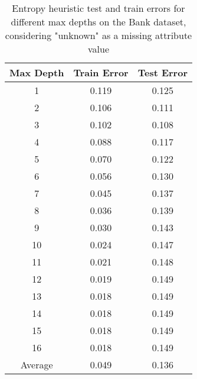 \documentclass[12pt, fullpage,letterpaper]{article}
\begin{document}
\begin{enumerate}
\begin{enumerate}
\newpage
\begin{table}[ht]
	\centering
	\begin{tabular}{|c|c|c|}
        \hline
		Max Depth & Train Error & Test Error\\ 
		\hline\hline
		1 & 0.119 & 0.125 \\ \hline
		2 & 0.106 & 0.111 \\ \hline
		3 & 0.102 & 0.108 \\ \hline
		4 & 0.088 & 0.117 \\ \hline
		5 & 0.070 & 0.122 \\ \hline
		6 & 0.056 & 0.130 \\ \hline
		7 & 0.045 & 0.137 \\ \hline
		8 & 0.036 & 0.139 \\ \hline
		9 & 0.030 & 0.143 \\ \hline
		10 & 0.024 & 0.147 \\ \hline
		11 & 0.021 & 0.148 \\ \hline
		12 & 0.019 & 0.149 \\ \hline
		13 & 0.018 & 0.149 \\ \hline
		14 & 0.018 & 0.149 \\ \hline
		15 & 0.018 & 0.149 \\ \hline
		16 & 0.018 & 0.149 \\ \hline
		Average & 0.049 & 0.136 \\ \hline
	\end{tabular}
	\caption{Entropy heuristic test and train errors for different max depths on the Bank dataset, considering "unknown" as a missing attribute value}
    \label{table:3bentropy}
\end{table}


\end{enumerate}
\end{enumerate}
\end{document}
